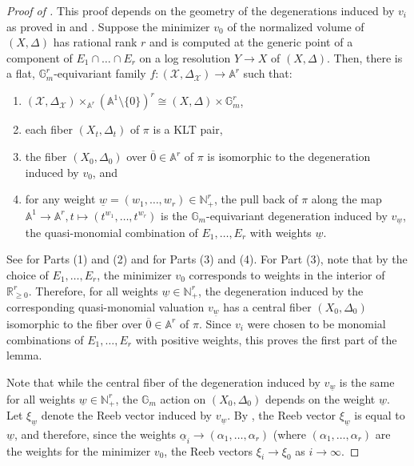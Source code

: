 \documentclass[11pt,reqno]{amsart}
\newcommand{\A}{\mathbb{A}}
\newcommand{\G}{\mathbb{G}}
\newcommand{\R}{\mathbb{R}}
\newcommand{\N}{\mathbb{N}}
\newcommand{\cX}{\mathcal{X}}
\newcommand{\isom}{\cong}
\numberwithin{equation}{section}
\theoremstyle{definition}
\begin{document}
\begin{proof}[Proof of ] This proof depends on the geometry of the degenerations induced by $v_i$ as proved in \cite{XuTowardsFiniteGeneration} and \cite{XuZhuangStableDegenerations}. Suppose the minimizer $v_0$ of the normalized volume of $(X, \Delta)$ has rational rank $r$ and is computed at the generic point of a component of $E_1 \cap \dots \cap E_r$ on a log resolution $Y \to X$ of $(X, \Delta)$. Then, there is a flat, $\G_m ^r$-equivariant family $f: (\cX, \Delta_{\cX}) \to \A^r$ such that:
\begin{enumerate}
    \item $(\cX, \Delta_{\cX}) \times_{\A^r} (\A^1 \setminus \{0\})^r \isom (X, \Delta) \times \G_m ^r$,
    \item each fiber $(X_t, \Delta_t)$ of $\pi$ is a KLT pair,
    \item the fiber $(X_0, \Delta_0)$ over $\overline{0} \in \A^r$ of $\pi$ is isomorphic to the degeneration induced by $v_0$, and
    \item for any weight $\underline{w} = (w_1, \dots, w_r) \in \N_{+} ^r$, the pull back of $\pi$ along the map $\A^1 \to \A^r, t \mapsto (t^{w_1}, \dots, t^{w_r})$ is the $\G_m$-equivariant degeneration induced by $v_{\underline{w}}$, the quasi-monomial combination of $E_1, \dots, E_r$ with weights $\underline{w}$.
\end{enumerate}  
See \cite[Proposition 4.5]{XuZhuangStableDegenerations} for Parts (1) and (2) and \cite[Corollary 4.10]{XuZhuangStableDegenerations} for Parts (3) and (4). For Part (3), note that by the choice of $E_1, \dots, E_r$, the minimizer $v_0$ corresponds to weights in the interior of $\R_{\geq 0} ^r$. Therefore, for all weights $\underline{w} \in \N_+ ^r$, the degeneration induced by the corresponding quasi-monomial valuation $v_{\underline{w}}$ has a central fiber $(X_0, \Delta_0)$ isomorphic to the fiber over $\overline{0} \in \A^r$ of $\pi$. Since $v_i$ were chosen to be monomial combinations of $E_1, \dots, E_r$ with positive weights, this proves the first part of the lemma.

Note that while the central fiber of the degeneration induced by $v_{\underline{w}}$ is the same for all weights $\underline{w} \in \N_+ ^r$, the $\G_m$ action on $(X_0, \Delta_0)$ depends on the weight $\underline{w}$. Let $\xi_{\underline{w}}$ denote the Reeb vector induced by $v_{\underline{w}}$. By \cite[Lemma 3.8]{XuTowardsFiniteGeneration}, the Reeb vector $\xi_{\underline{w}}$ is equal to $\underline{w}$, and therefore, since the weights $\underline{\alpha}_i \to (\alpha_1, \dots, \alpha_r)$ (where $(\alpha_1, \dots, \alpha_r)$ are the weights for the minimizer $v_0$, the Reeb vectors $\xi_{i} \to \xi_0$ as $i \to \infty$. 
\end{proof}
\end{document}
